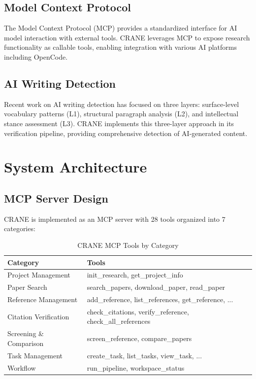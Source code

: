 \documentclass{article}
\begin{document}
\subsection{Model Context Protocol}

The Model Context Protocol (MCP) provides a standardized interface for AI model interaction with external tools. CRANE leverages MCP to expose research functionality as callable tools, enabling integration with various AI platforms including OpenCode.

\subsection{AI Writing Detection}

Recent work on AI writing detection has focused on three layers: surface-level vocabulary patterns (L1), structural paragraph analysis (L2), and intellectual stance assessment (L3). CRANE implements this three-layer approach in its verification pipeline, providing comprehensive detection of AI-generated content.

\section{System Architecture}
\label{sec:architecture}

\subsection{MCP Server Design}

CRANE is implemented as an MCP server with 28 tools organized into 7 categories:

\begin{table}[h]
\centering
\begin{tabular}{ll}
\toprule
\textbf{Category} & \textbf{Tools} \\
\midrule
Project Management & init\_research, get\_project\_info \\
Paper Search & search\_papers, download\_paper, read\_paper \\
Reference Management & add\_reference, list\_references, get\_reference, ... \\
Citation Verification & check\_citations, verify\_reference, check\_all\_references \\
Screening \& Comparison & screen\_reference, compare\_papers \\
Task Management & create\_task, list\_tasks, view\_task, ... \\
Workflow & run\_pipeline, workspace\_status \\
\bottomrule
\end{tabular}
\caption{CRANE MCP Tools by Category}
\label{tab:tools}
\end{table}
\end{document}
